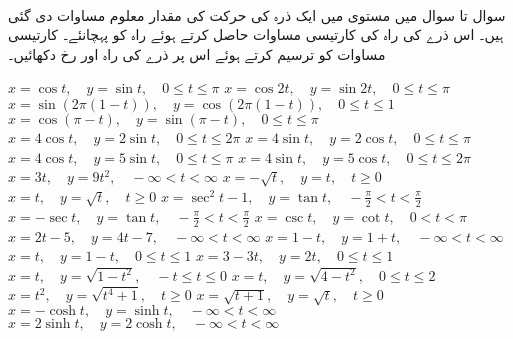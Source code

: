 \\
سوال  تا سوال  میں  مستوی میں ایک ذرہ کی حرکت کی مقدار معلوم مساوات دی گئی ہیں۔ اس ذرے کی راہ کی کارتیسی مساوات حاصل کرتے ہوئے راہ کو پہچانئے۔ کارتیسی مساوات کو ترسیم کرتے ہوئے اس پر ذرے کی راہ اور رخ دکھائیں۔ 

$x=\cos t,\quad y=\sin t,\quad 0\le t\le \pi$
$x=\cos 2t,\quad y=\sin 2t,\quad 0\le t\le \pi$
$x=\sin(2\pi(1-t)),\quad y=\cos(2\pi(1-t)),\quad 0\le t\le 1$
$x=\cos(\pi-t),\quad y=\sin(\pi-t),\quad 0\le t\le \pi$
$x=4\cos t,\quad y=2\sin t,\quad 0\le t\le 2\pi$
$x=4\sin t,\quad y=2\cos t,\quad 0\le t\le \pi$
$x=4\cos t,\quad y=5\sin t,\quad 0\le t\le \pi$
$x=4\sin t,\quad y=5\cos t,\quad 0\le t\le 2\pi$
$x=3t,\quad y=9t^2,\quad -\infty<t<\infty$
$x=-\sqrt{t},\quad y=t,\quad t\ge 0$
$x=t,\quad y=\sqrt{t},\quad t\ge 0$
$x=\sec^2t-1,\quad y=\tan t,\quad -\tfrac{\pi}{2}<t<\tfrac{\pi}{2}$
$x=-\sec t,\quad y=\tan t,\quad -\tfrac{\pi}{2}<t<\tfrac{\pi}{2}$
$x=\csc t,\quad y=\cot t,\quad 0<t<\pi$
$x=2t-5,\quad y=4t-7,\quad -\infty<t<\infty$
$x=1-t,\quad y=1+t,\quad -\infty<t<\infty$
$x=t,\quad y=1-t,\quad 0\le t\le 1$
$x=3-3t,\quad y=2t,\quad 0\le t\le 1$
$x=t,\quad y=\sqrt{1-t^2},\quad -t\le t\le 0$
$x=t,\quad y=\sqrt{4-t^2},\quad 0\le t\le 2$
$x=t^2,\quad y=\sqrt{t^4+1},\quad t\ge 0$
$x=\sqrt{t+1},\quad y=\sqrt{t},\quad t\ge 0$
$x=-\cosh t,\quad y=\sinh t,\quad -\infty<t<\infty$
$x=2\sinh t,\quad y=2\cosh t,\quad -\infty<t<\infty$

